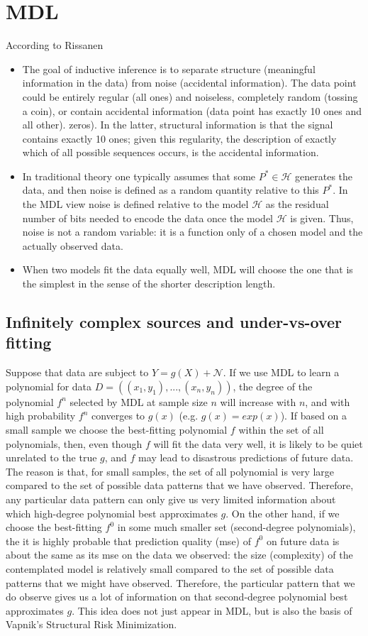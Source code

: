 \documentclass[class=article, crop=false]{standalone}
\numberwithin{equation}{section}
\begin{document}
\section{MDL}
According to Rissanen
\begin{itemize}
    \item The goal of inductive inference is to separate structure (meaningful information in the data) from noise (accidental information). The data point could be entirely regular (all ones) and noiseless, completely random (tossing a coin), or contain accidental information (data point has exactly 10 ones and all other). zeros). In the latter, structural information is that the signal contains exactly 10 ones; given this regularity, the description of exactly which of all possible sequences occurs, is the accidental information.
    \item In traditional theory one typically assumes that some $P^*\in \mathcal{H}$ generates the data, and then noise is defined as a random quantity relative to this $P^*$. In the MDL view noise is defined relative to the model $\mathcal{H}$ as the residual number of bits needed to encode the data once the model $\mathcal{H}$ is given. Thus, noise is not a random variable: it is a function only of a chosen model and the actually observed data.
    \item When two models fit the data equally well, MDL will choose the one that is the simplest in the sense of the shorter description length.
\end{itemize}
\subsection{Infinitely complex sources and under-vs-over fitting}

Suppose that data are subject to $Y=g(X) + \mathcal{N}$. If we use MDL to learn a polynomial for data $D=((x_1, y_1), ..., (x_n, y_n))$, the degree of the polynomial $f^n$ selected by MDL at sample size $n$ will increase with $n$, and with high probability $f^n$ converges to $g(x)$ (e.g. $g(x)=exp(x)$). If based on a small sample we choose the best-fitting polynomial $f$ within the set of all polynomials, then, even though $f$ will fit the data very well, it is likely to be quiet unrelated to the true $g$, and $f$ may lead to disastrous predictions of future data. The reason is that, for small samples, the set of all polynomial is very large compared to the set of possible data patterns that we have observed. Therefore, any particular data pattern can only give us very limited information about which high-degree polynomial best approximates $g$. On the other hand, if we choose the best-fitting $f^0$ in some much smaller set (second-degree polynomials), the it is highly probable that prediction quality (mse) of $f^0$ on future data is about the same as its mse on the data we observed: the size (complexity) of the contemplated model is relatively small compared to the set of possible data patterns that we might have observed. Therefore, the particular pattern that we do observe gives us a lot of information on that second-degree polynomial best approximates $g$. This idea does not just appear in MDL, but is also the basis of Vapnik's Structural Risk Minimization.
\end{document}
